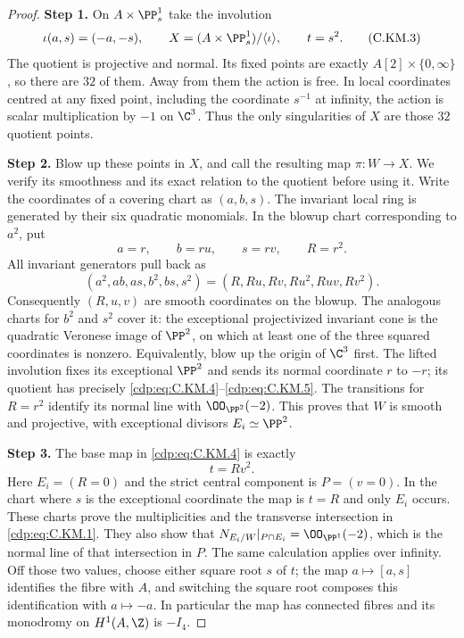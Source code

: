 \begin{proof}
\noindent\textbf{Step 1.} On $A\times\PP^1_s$ take the involution
\[
       \iota(a,s)=(-a,-s),\qquad
 X=(A\times\PP^1_s)/\langle\iota\rangle,
       \qquad t=s^2.                                  \tag{C.KM.3}\label{cdp:eq:C.KM.3}
\]
The quotient is projective and normal. Its fixed points are
exactly $A[2]\times\{0,\infty\}$, so there are $32$ of them.
Away from them the action is free. In local coordinates centred
at any fixed point, including the coordinate $s^{-1}$ at
infinity, the action is scalar multiplication by $-1$ on
$\C^3$. Thus the only singularities of $X$ are those $32$
quotient points.

\noindent\textbf{Step 2.} Blow up these points in $X$, and call the resulting map
$\pi:W\to X$. We verify its smoothness and its exact relation
to the quotient before using it. Write the coordinates of a
covering chart as $(a,b,s)$. The invariant local ring is
generated by their six quadratic monomials. In the blowup
chart corresponding to $a^2$, put
\[
             a=r,\qquad b=ru,\qquad s=rv,
             \qquad R=r^2.                            \tag{C.KM.4}\label{cdp:eq:C.KM.4}
\]
All invariant generators pull back as
\[
 (a^2,ab,as,b^2,bs,s^2)
           =(R,Ru,Rv,Ru^2,Ruv,Rv^2).                  \tag{C.KM.5}\label{cdp:eq:C.KM.5}
\]
Consequently $(R,u,v)$ are smooth coordinates on the blowup.
The analogous charts for $b^2$ and $s^2$ cover it: the
exceptional projectivized invariant cone is the quadratic
Veronese image of $\PP^2$, on which at least one of the
three squared coordinates is nonzero. Equivalently, blow up
the origin of $\C^3$ first. The lifted involution fixes its
exceptional $\PP^2$ and sends its normal coordinate $r$ to
$-r$; its quotient has precisely \eqref{cdp:eq:C.KM.4}--\eqref{cdp:eq:C.KM.5}.
The transitions for $R=r^2$ identify its normal line with
$\OO_{\PP^2}(-2)$. This proves that $W$ is smooth and
projective, with exceptional divisors $E_i\simeq\PP^2$.

\noindent\textbf{Step 3.} The base map in \eqref{cdp:eq:C.KM.4} is exactly
\[
                             t=R v^2.                 \tag{C.KM.6}\label{cdp:eq:C.KM.6}
\]
Here $E_i=(R=0)$ and the strict central component is
$P=(v=0)$. In the chart where $s$ is the exceptional
coordinate the map is $t=R$ and only $E_i$ occurs.
These charts prove the multiplicities and the transverse
intersection in \eqref{cdp:eq:C.KM.1}. They also show that
$N_{E_i/W}|_{P\cap E_i}=\OO_{\PP^1}(-2)$, which is
the normal line of that intersection in $P$.
The same calculation applies over infinity. Off those two
values, choose either square root $s$ of $t$; the map
$a\mapsto[a,s]$ identifies the fibre with $A$, and switching
the square root composes this identification with $a\mapsto-a$.
In particular the map has connected fibres and its monodromy
on $H^1(A,\Z)$ is $-I_4$.


\end{proof}
